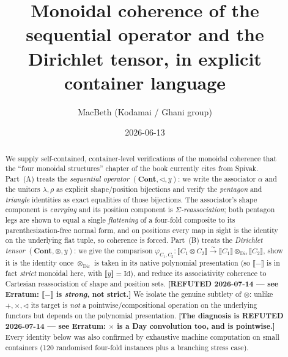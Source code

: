 \documentclass[11pt]{article}
\title{Monoidal coherence of the sequential operator and the Dirichlet tensor,
in explicit container language}
\author{MacBeth (Kodamai / Ghani group)}
\date{2026-06-13}
\theoremstyle{definition}
\newcommand{\Cont}{\mathbf{Cont}}
\newcommand{\ext}[1]{\llbracket #1 \rrbracket}
\newcommand{\tri}{\mathbin{\triangleleft}}
\newcommand{\dir}{\mathbin{\otimes}}
\begin{document}
\maketitle

\begin{abstract}
We supply self-contained, container-level verifications of the monoidal
coherence that the ``four monoidal structures'' chapter of the book currently cites from
Spivak. Part~(A) treats the \emph{sequential operator}
$(\Cont,\tri,y)$: we write the associator $\alpha$ and the unitors
$\lambda,\rho$ as explicit shape/position bijections and verify the
\emph{pentagon} and \emph{triangle} identities as exact equalities of those
bijections. The associator's shape component is \emph{currying} and its
position component is \emph{$\Sigma$-reassociation}; both pentagon legs are
shown to equal a single \emph{flattening} of a four-fold composite to its
parenthesization-free normal form, and on positions every map in sight is the
identity on the underlying flat tuple, so coherence is forced. Part~(B) treats
the \emph{Dirichlet tensor} $(\Cont,\dir,y)$: we give the comparison
$\varphi_{C_1,C_2}\colon \ext{C_1\dir C_2}\xrightarrow{\;\sim\;}
\ext{C_1}\dir_{\mathrm{Dir}}\ext{C_2}$, show it is the identity once
$\dir_{\mathrm{Dir}}$ is taken in its native polynomial presentation
(so $\ext{-}$ is in fact \emph{strict} monoidal here, with $\ext y=\mathrm{Id}$),
and reduce its associativity coherence to Cartesian reassociation of shape and
position sets. \textbf{[REFUTED 2026-07-14 --- see Erratum: $\ext{-}$ is
\emph{strong}, not strict.]}
We isolate the genuine subtlety of $\dir$: unlike $+,\times,\tri$
its target is \emph{not} a pointwise/compositional operation on the underlying
functors but depends on the polynomial presentation.
\textbf{[The diagnosis is REFUTED 2026-07-14 --- see Erratum: $\times$ is a Day
convolution too, and is pointwise.]}
Every identity below was
also confirmed by exhaustive machine computation on small containers
(120 randomised four-fold instances plus a branching stress case).
\end{abstract}
\end{document}
